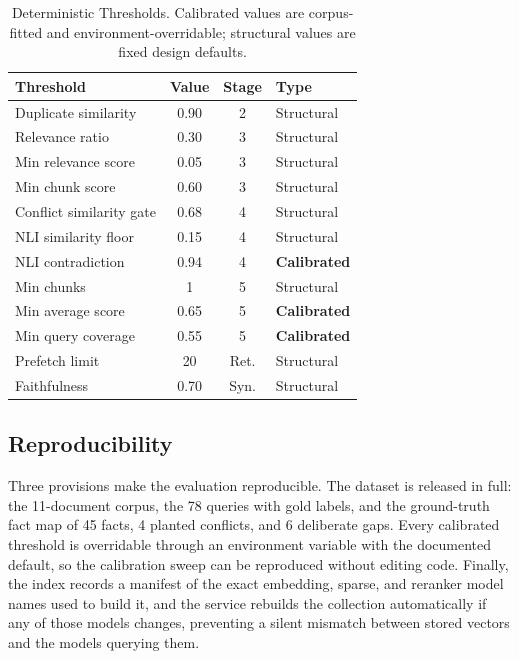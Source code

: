 \documentclass[conference]{IEEEtran}
\begin{document}
\begin{table}[htbp]
\caption{Deterministic Thresholds. Calibrated values are corpus-fitted and
environment-overridable; structural values are fixed design defaults.}
\label{tab:thresholds}
\centering
\small
\begin{tabularx}{\columnwidth}{@{}X c c l@{}}
\toprule
Threshold & Value & Stage & Type \\
\midrule
Duplicate similarity     & 0.90 & 2 & Structural \\
Relevance ratio          & 0.30 & 3 & Structural \\
Min relevance score      & 0.05 & 3 & Structural \\
Min chunk score          & 0.60 & 3 & Structural \\
Conflict similarity gate & 0.68 & 4 & Structural \\
NLI similarity floor     & 0.15 & 4 & Structural \\
NLI contradiction        & 0.94 & 4 & \textbf{Calibrated} \\
Min chunks               & 1    & 5 & Structural \\
Min average score        & 0.65 & 5 & \textbf{Calibrated} \\
Min query coverage       & 0.55 & 5 & \textbf{Calibrated} \\
Prefetch limit           & 20   & Ret. & Structural \\
Faithfulness             & 0.70 & Syn. & Structural \\
\bottomrule
\end{tabularx}
\end{table}

\subsection{Reproducibility}
Three provisions make the evaluation reproducible. The dataset is released
in full: the 11-document corpus, the 78 queries with gold labels, and the
ground-truth fact map of 45 facts, 4 planted conflicts, and 6 deliberate
gaps. Every calibrated threshold is overridable through an environment
variable with the documented default, so the calibration sweep can be
reproduced without editing code. Finally, the index records a manifest of
the exact embedding, sparse, and reranker model names used to build it, and
the service rebuilds the collection automatically if any of those models
changes, preventing a silent mismatch between stored vectors and the models
querying them.
\end{document}
